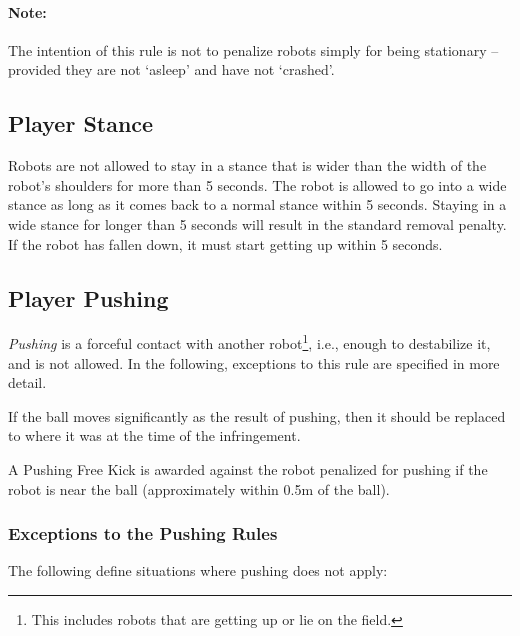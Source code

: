 \documentclass[12pt]{article}
\begin{document}
\paragraph{Note:} The intention of this rule is not to penalize robots simply for being stationary -- provided they are not `asleep' and have not `crashed'.

\subsection{Player Stance}
\label{sec:player_stance}

Robots are not allowed to stay in a stance that is wider than the width of the robot's shoulders for more than 5 seconds. The robot is allowed to go into a wide stance as long as it comes back to a normal stance within 5 seconds. Staying in a wide stance for longer than 5 seconds will result in the standard removal penalty. If the robot has fallen down, it must start getting up within 5 seconds. 

\subsection{Player Pushing}
\label{sec:player_pushing}

\emph{Pushing} is a forceful contact with another robot\footnote{This includes robots that are getting up or lie on the field.}, i.e., enough to destabilize it, and is not allowed. In the following, exceptions to this rule are specified in more detail.

If the ball moves significantly as the result of pushing, then it should be replaced to where it was at the time of the infringement.

A Pushing Free Kick is awarded against the robot penalized for pushing if the robot is near the ball (approximately within 0.5m of the ball).

\subsubsection{Exceptions to the Pushing Rules}
\label{sec:situations_no_pushing}

The following define situations where pushing does not apply:
\end{document}
